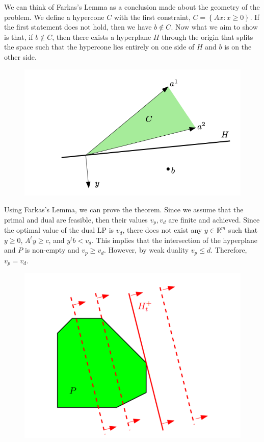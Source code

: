 \documentclass[../notes.tex]{subfiles}
\begin{document}
\begin{blockquote}
We can think of Farkas's Lemma as a conclusion made about the geometry of the problem.
We define a hypercone $ C$ with the first constraint, $C = \left\{ Ax: x \ge 0 \right\} $.
If the first statement does not hold, then we have $ b \notin C $.
Now what we aim to show is that, if $ b \notin C $, then there exists a hyperplane $ H $ through the origin that splits the space such that the hypercone lies entirely on one side of $ H $ and $ b $ is on the other side.

\begin{figure}[H]
    \centering
    \includegraphics[width=0.8\linewidth]{img/image_2023-04-03-15-54-43.png}
\end{figure}
    
\end{blockquote}

Using Farkas's Lemma, we can prove the theorem.
Since we assume that the primal and dual are feasible, then their values $ v_p, v_d $ are finite and achieved. 
Since the optimal value of the dual LP is $ v_d $, there does not exist any $ y \in \mathbb{R}^m$ such that $ y \ge 0  $, $ A^ty \ge c $, and $ y^tb < v_d$. 
This implies that the intersection of the hyperplane and $ P $  is non-empty and $ v_p \ge  v_d $. However, by weak duality $ v_p \le d $. Therefore, $ v_p = v_d $.

\begin{figure}[H]
    \centering
    \includegraphics[width=0.8\linewidth]{img/image_2023-04-06-02-03-46.png}
\end{figure}
\end{document}
